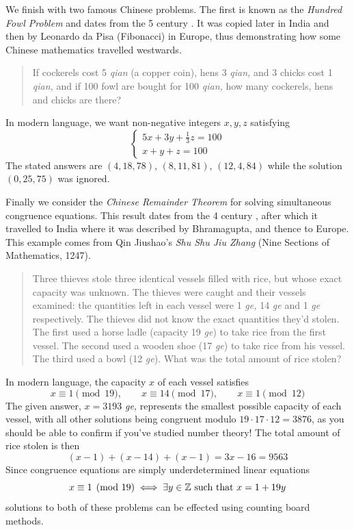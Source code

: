 \goodbreak



We finish with two famous Chinese problems. The first is known as the  \emph{Hundred Fowl Problem} and dates from the 5\th{} century \AD\!. It was copied later in India and then by Leonardo da Pisa (Fibonacci) in Europe, thus demonstrating how some Chinese mathematics travelled westwards.

\begin{quote}
	If cockerels cost 5 \emph{qian } (a copper coin), hens 3 \emph{qian,} and 3 chicks cost 1 \emph{qian,} and if 100 fowl are bought for 100 \emph{qian,} how many cockerels, hens and chicks are there?
\end{quote}

In modern language, we want non-negative integers $x,y,z$ satisfying
\[
	\begin{cases}
	  5x+3y+\frac 13z=100\\
	  x+y+z=100
  \end{cases}
\]
The stated answers are $(4,18,78)$, $(8,11,81)$, $(12,4,84)$ while the solution $(0,25,75)$ was ignored.
\bigbreak

  
Finally we consider the \emph{Chinese Remainder Theorem} for solving simultaneous congruence equations. This result dates from the 4\th{} century \AD\!, after which it travelled to India where it was described by Bhramagupta, and thence to Europe. This example comes from Qin Jiushao's \emph{Shu Shu Jiu Zhang} (Nine Sections of Mathematics, 1247).  

\begin{quote}
	Three thieves stole three identical vessels filled with rice, but whose exact capacity was unknown. The thieves were caught and their vessels examined: the quantities left in each vessel were 1 \emph{ge,} 14 \emph{ge} and 1 \emph{ge} respectively. The thieves did not know the exact quantities they'd stolen. The first used a horse ladle (capacity 19 \emph{ge}) to take rice from the first vessel. The second used a wooden shoe (17 \emph{ge}) to take rice from his vessel. The third used a bowl (12 \emph{ge}). What was the total amount of rice stolen?
\end{quote}
  
In modern language, the capacity $x$ of each vessel satisfies
\[
	x\equiv 1\pmod{19},\qquad x\equiv 14\pmod{17},\qquad x\equiv 1\pmod{12}
\]
The given answer, $x=3193$ \emph{ge,} represents the smallest possible capacity of each vessel, with all other solutions being congruent modulo $19\cdot 17\cdot 12=3876$, as you should be able to confirm if you've studied number theory! The total amount of rice stolen is then
\[
	(x-1)+(x-14)+(x-1)=3x-16=9563
\]
Since congruence equations are simply underdetermined linear equations
\[
	x\equiv 1\pmod{19}\iff \exists y\in\mathbb{Z}\text{ such that }x=1+19y
\]
solutions to both of these problems can be effected using counting board methods.
  
